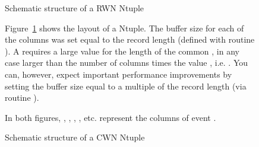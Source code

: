 \begin{figure}[p]
\vspace*{-5mm}
{\centering{}}
\caption{Schematic structure of a RWN Ntuple}
\label{fig:rwn}
{\centering{}}
\caption{Schematic structure of a CWN Ntuple}
\label{fig:cwn}
\newcommand{\III}{\(\sb{\mathtt{i}}\)}

\small

Figure~\ref{fig:cwn} shows the layout of a \CWN{} Ntuple.
The buffer size for each of the columns
 was set equal to the record length 
(defined with routine ).
A \CWN{} requires a large value for the length of the common ,
%
in any case larger than the number of columns
times the value , i.e. .
You can, however, expect important performance improvements by setting
the buffer size  equal to a
multiple of the record length  (via routine ).

In both figures, \Lit{x\III}, \Lit{y\III}, \Lit{z\III},
\Lit{t\III}, etc. represent the columns of event .

\end{figure}
\clearpage

